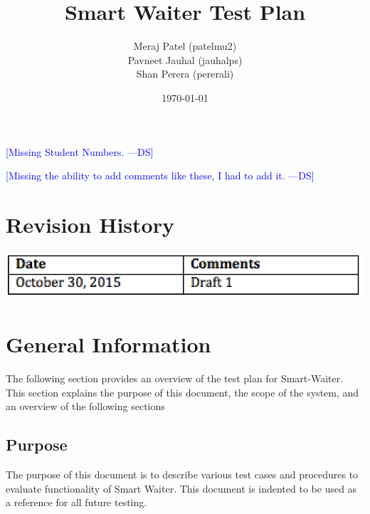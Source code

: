 \documentclass[12pt]{article}
\newcommand{\authornote}[3]{\textcolor{#1}{[#3 ---#2]}}
\newcommand{\authornote}[3]{}
\newcommand{\ds}[1]{\authornote{blue}{DS}{#1}}
\begin{document}
\title{Smart Waiter Test Plan} 
\author{Meraj Patel (patelmu2) \\ Pavneet Jauhal (jauhalps)\\ Shan Perera (pererali)}
\date{\today}
\maketitle
\ds{Missing Student Numbers.}

\ds{Missing the ability to add comments like these, I had to add it.}
\pagebreak

\tableofcontents

\listoftables

\section*{Revision History}
\includegraphics[width=\textwidth,height=\textheight,keepaspectratio]{revision.png}



\pagebreak
%
%

\section{General Information}
The following section provides an overview of the test plan 
for Smart-Waiter.
 This section explains the purpose of this document, the scope of the system, and an overview of the following sections

\subsection{Purpose}
The purpose of this document is to describe  various test cases and procedures to evaluate functionality of Smart Waiter.
This document is indented to be used as a reference for all future testing. 
\end{document}
